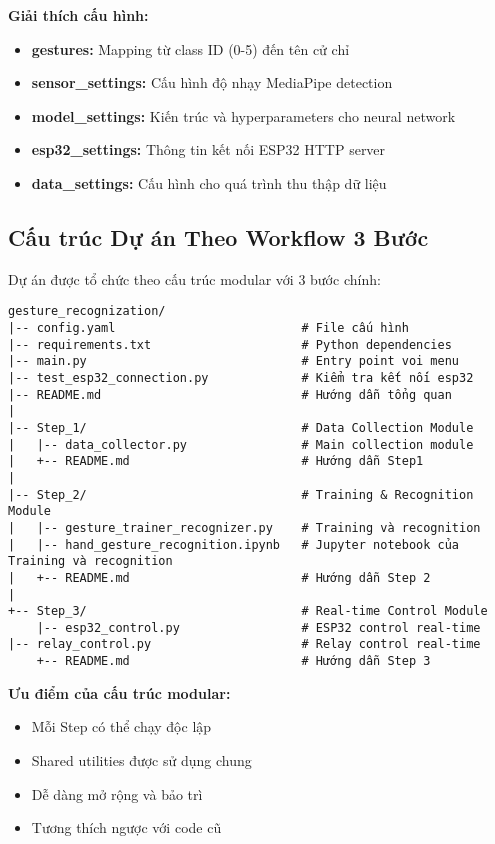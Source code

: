 \textbf{Giải thích cấu hình:}
\begin{itemize}
    \item \textbf{gestures:} Mapping từ class ID (0-5) đến tên cử chỉ
    \item \textbf{sensor\_settings:} Cấu hình độ nhạy MediaPipe detection
    \item \textbf{model\_settings:} Kiến trúc và hyperparameters cho neural network
    \item \textbf{esp32\_settings:} Thông tin kết nối ESP32 HTTP server
    \item \textbf{data\_settings:} Cấu hình cho quá trình thu thập dữ liệu
\end{itemize}

\subsection{Cấu trúc Dự án Theo Workflow 3 Bước}

Dự án được tổ chức theo cấu trúc modular với 3 bước chính:

\begin{verbatim}
gesture_recognization/
|-- config.yaml                          # File cấu hình
|-- requirements.txt                     # Python dependencies  
|-- main.py                              # Entry point voi menu
|-- test_esp32_connection.py             # Kiểm tra kết nối esp32
|-- README.md                            # Hướng dẫn tổng quan
|
|-- Step_1/                              # Data Collection Module
|   |-- data_collector.py                # Main collection module
|   +-- README.md                        # Hướng dẫn Step1
|
|-- Step_2/                              # Training & Recognition Module
|   |-- gesture_trainer_recognizer.py    # Training và recognition
|   |-- hand_gesture_recognition.ipynb   # Jupyter notebook của Training và recognition
|   +-- README.md                        # Hướng dẫn Step 2
|
+-- Step_3/                              # Real-time Control Module
    |-- esp32_control.py                 # ESP32 control real-time
|-- relay_control.py                     # Relay control real-time
    +-- README.md                        # Hướng dẫn Step 3
\end{verbatim}

\textbf{Ưu điểm của cấu trúc modular:}
\begin{itemize}
    \item Mỗi Step có thể chạy độc lập
    \item Shared utilities được sử dụng chung
    \item Dễ dàng mở rộng và bảo trì
    \item Tương thích ngược với code cũ
\end{itemize}

